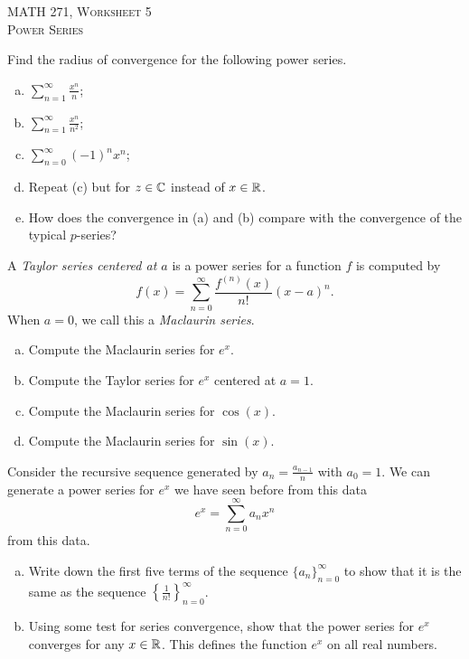 \documentclass[12pt]{article} %
\begin{document}
\begin{center}
   \textsc{\large MATH 271, Worksheet 5}\\
   \textsc{Power Series}
\end{center}
\vspace{.5cm}

\begin{problem}
Find the radius of convergence for the following power series.
\begin{enumerate}[(a)]
    \item $\displaystyle{\sum_{n=1}^\infty \frac{x^n}{n}}$;
    \item $\displaystyle{\sum_{n=1}^\infty \frac{x^n}{n^2}}$;
    \item $\displaystyle{\sum_{n=0}^\infty (-1)^n x^n}$;
    \item Repeat (c) but for $z\in \mathbb{C}$ instead of $x\in \mathbb{R}$.
    \item How does the convergence in (a) and (b) compare with the convergence of the typical $p$-series?
\end{enumerate}
\end{problem}

\begin{problem}
A \emph{Taylor series centered at $a$} is a power series for a function $f$ is computed by 
\[
f(x) = \sum_{n=0}^\infty \frac{f^{(n)}(x)}{n!}(x-a)^n.
\]
When $a=0$, we call this a \emph{Maclaurin series}.  
\begin{enumerate}[(a)]
    \item Compute the Maclaurin series for $e^x$.
    \item Compute the Taylor series for $e^x$ centered at $a=1$.
    \item Compute the Maclaurin series for $\cos(x)$.
    \item Compute the Maclaurin series for $\sin(x)$.
\end{enumerate}
\end{problem}

\begin{problem}
Consider the recursive sequence generated by $a_n = \frac{a_{n-1}}{n}$ with $a_0=1$.  We can generate a power series for $e^x$ we have seen before from this data
\[
e^x=\sum_{n=0}^\infty a_n x^n
\]
from this data. 
\begin{enumerate}[(a)]
    \item Write down the first five terms of the sequence $\{a_n\}_{n=0}^\infty$ to show that it is the same as the sequence $\left\{\frac{1}{n!}\right\}_{n=0}^\infty$.
    \item Using some test for series convergence, show that the power series for $e^x$ converges for any $x\in \mathbb{R}$. This defines the function $e^x$ on all real numbers.
\end{enumerate}
\end{problem}
\end{document}
